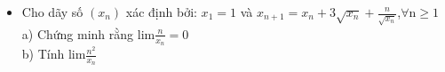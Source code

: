 \documentclass[11pt]{scrartcl}
\begin{document}
\begin{itemize}[label=, leftmargin=0em, itemsep=-0em]

    \item \begin{btvn}
        Cho dãy số $(x_n)$ xác định bởi: $x_1=1$ và $x_{n+1}=x_n+3\sqrt{x_n} + \frac{n}{\sqrt{x_n}}$,$\forall$n$\ge1$\\
a) Chứng minh rằng lim$\frac{n}{x_n}=0$\\ 
b) Tính lim$\frac{n^2}{x_n}$
    \end{btvn}



\end{itemize}
\end{document}

